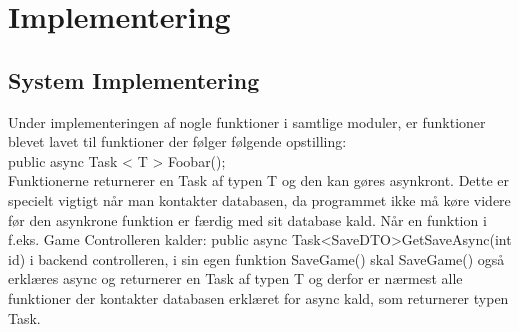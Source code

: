 \section{Implementering}
\subsection{System Implementering}
Under implementeringen af nogle funktioner i samtlige moduler, er funktioner blevet lavet til funktioner der følger følgende opstilling:\\
public async Task < T > Foobar();\\ 
Funktionerne returnerer en Task af typen T og den kan gøres asynkront. Dette er specielt vigtigt når man kontakter databasen, da programmet ikke må køre videre før den asynkrone funktion er færdig med sit database kald. Når en funktion i f.eks. Game Controlleren kalder: public async Task<SaveDTO>GetSaveAsync(int id) i backend controlleren, i sin egen funktion SaveGame() skal SaveGame() også erklæres async og returnerer en Task af typen T og derfor er nærmest alle funktioner der kontakter databasen erklæret for async kald, som returnerer typen Task.




